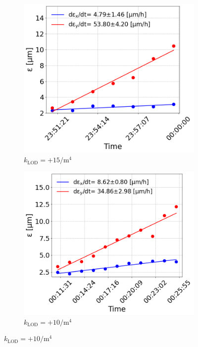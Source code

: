 \begin{figure}[htp]
    \centering
    \begin{subfigure}{.45\textwidth}
        \centering
        \includegraphics[width=.95\linewidth]{images/app_c/emit_vs_time_Set1_coast1.png}  
        \caption{$k_\mathrm{LOD}=+15 \mathrm{/m^{4}}$}
    \end{subfigure}
    \begin{subfigure}{.45\textwidth}
        \centering
        \includegraphics[width=.95\linewidth]{images/app_c/emit_vs_time_Set1_coast2.png}  
        \caption{$k_\mathrm{LOD}=+10 \mathrm{/m^{4}}$}

\end{subfigure}
\end{figure}
